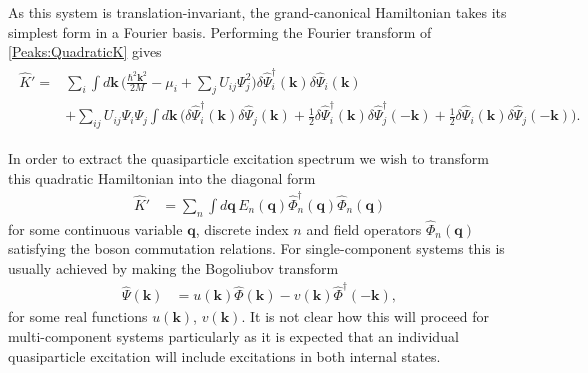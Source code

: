 As this system is translation-invariant, the grand-canonical Hamiltonian takes its simplest form in a Fourier basis. Performing the Fourier transform of \eqref{Peaks:QuadraticK} gives
\begin{align}
    \begin{split}
        \hat{K}' =& \sum_i \int d\mathbf{k}\, \bigg(\frac{\hbar^2 \mathbf{k}^2}{2M} - \mu_i + \sum_j U_{ij} \Psi_j^2\bigg) \delta\hat{\Psi}_i^\dagger(\mathbf{k}) \delta\hat{\Psi}_i(\mathbf{k}) \\
        &+ \sum_{i j} U_{i j}\Psi_i \Psi_j\int d\mathbf{k}\, \Big( \delta\hat{\Psi}_i^\dagger(\mathbf{k}) \delta\hat{\Psi}_j(\mathbf{k}) + \frac{1}{2}\delta\hat{\Psi}_i^\dagger(\mathbf{k}) \delta\hat{\Psi}_j^\dagger (-\mathbf{k}) + \frac{1}{2} \delta\hat{\Psi}_i(\mathbf{k}) \delta\hat{\Psi}_j(-\mathbf{k})\Big) .
    \end{split}
    \label{Peaks:QuadraticKKSpace}
\end{align}

In order to extract the quasiparticle excitation spectrum we wish to transform this quadratic Hamiltonian into the diagonal form
\begin{align}
    \hat{K}' &= \sum_n \int d\mathbf{q}\, E_n(\mathbf{q}) \hat{\Phi}_n^\dagger(\mathbf{q}) \hat{\Phi}_n(\mathbf{q}) \label{Peaks:DesiredQuadraticForm}
\end{align}
for some continuous variable $\mathbf{q}$, discrete index $n$ and field operators $\hat{\Phi}_n(\mathbf{q})$ satisfying the boson commutation relations. For single-component systems this is usually achieved by making the Bogoliubov transform
\begin{align}
    \hat{\Psi}(\mathbf{k}) &= u(\mathbf{k}) \hat{\Phi}(\mathbf{k}) - v(\mathbf{k}) \hat{\Phi}^\dagger(-\mathbf{k}), \label{Peaks:BogoliubovTransformation}
\end{align}
for some real functions $u(\mathbf{k})$, $v(\mathbf{k})$. It is not clear how this will proceed for multi-component systems particularly as it is expected that an individual quasiparticle excitation will include excitations in both internal states.

